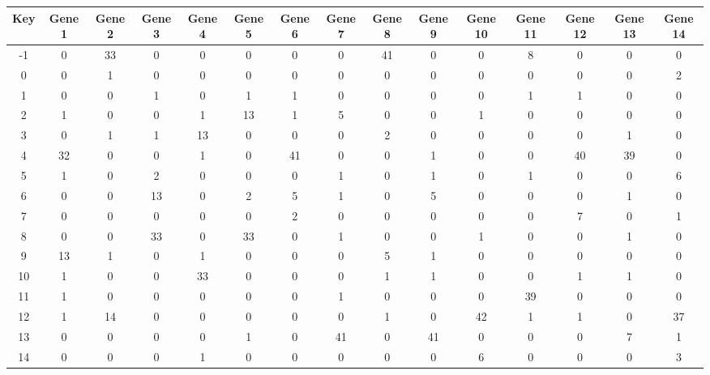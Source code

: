 \begin{tabular}{|c|c|c|c|c|c|c|c|c|c|c|c|c|c|c|}
\hline
Key & Gene 1 & Gene 2 & Gene 3 & Gene 4 & Gene 5 & Gene 6 & Gene 7 & Gene 8 & Gene 9 & Gene 10 & Gene 11 & Gene 12 & Gene 13 & Gene 14 \\
\hline
-1 & 0 & 33 & 0 & 0 & 0 & 0 & 0 & 41 & 0 & 0 & 8 & 0 & 0 & 0 \\
0 & 0 & 1 & 0 & 0 & 0 & 0 & 0 & 0 & 0 & 0 & 0 & 0 & 0 & 2 \\
1 & 0 & 0 & 1 & 0 & 1 & 1 & 0 & 0 & 0 & 0 & 1 & 1 & 0 & 0 \\
2 & 1 & 0 & 0 & 1 & 13 & 1 & 5 & 0 & 0 & 1 & 0 & 0 & 0 & 0 \\
3 & 0 & 1 & 1 & 13 & 0 & 0 & 0 & 2 & 0 & 0 & 0 & 0 & 1 & 0 \\
4 & 32 & 0 & 0 & 1 & 0 & 41 & 0 & 0 & 1 & 0 & 0 & 40 & 39 & 0 \\
5 & 1 & 0 & 2 & 0 & 0 & 0 & 1 & 0 & 1 & 0 & 1 & 0 & 0 & 6 \\
6 & 0 & 0 & 13 & 0 & 2 & 5 & 1 & 0 & 5 & 0 & 0 & 0 & 1 & 0 \\
7 & 0 & 0 & 0 & 0 & 0 & 2 & 0 & 0 & 0 & 0 & 0 & 7 & 0 & 1 \\
8 & 0 & 0 & 33 & 0 & 33 & 0 & 1 & 0 & 0 & 1 & 0 & 0 & 1 & 0 \\
9 & 13 & 1 & 0 & 1 & 0 & 0 & 0 & 5 & 1 & 0 & 0 & 0 & 0 & 0 \\
10 & 1 & 0 & 0 & 33 & 0 & 0 & 0 & 1 & 1 & 0 & 0 & 1 & 1 & 0 \\
11 & 1 & 0 & 0 & 0 & 0 & 0 & 1 & 0 & 0 & 0 & 39 & 0 & 0 & 0 \\
12 & 1 & 14 & 0 & 0 & 0 & 0 & 0 & 1 & 0 & 42 & 1 & 1 & 0 & 37 \\
13 & 0 & 0 & 0 & 0 & 1 & 0 & 41 & 0 & 41 & 0 & 0 & 0 & 7 & 1 \\
14 & 0 & 0 & 0 & 1 & 0 & 0 & 0 & 0 & 0 & 6 & 0 & 0 & 0 & 3 \\
\hline
\end{tabular}